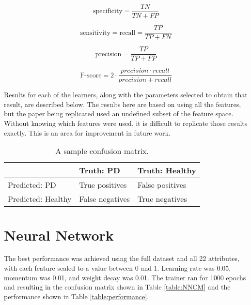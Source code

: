 \documentclass[draftcopy]{srpaper}
\begin{document}
\begin{equation}
\mbox{specificity} = \frac{TN}{TN + FP}
\label{eq:recall}
\end{equation}

\begin{equation}
\mbox{sensitivity} = \mbox{recall} = \frac{TP}{TP + FN}
\label{eq:recall}
\end{equation}

\begin{equation}
\mbox{precision} = \frac{TP}{TP + FP}
\label{eq:precision}
\end{equation}

\begin{equation}
\mbox{F-score} = 2 \cdot \frac{precision \cdot recall}{precision + recall}
\label{eq:fscore}
\end{equation}

Results for each of the learners, along with the parameters selected
to obtain that result, are described below. The results here are based on using all the features, but the paper
being replicated used an undefined subset of the feature
space. Without knowing which features were used, it is difficult to
replicate those results exactly. This is an area for
improvement in future work.

\begin{table}
\begin{center}
\begin{tabular}{|l|l|l|} 
\hline
& Truth: PD & Truth: Healthy \\ \hline
Predicted: PD & True positives & False positives \\ \hline
Predicted: Healthy & False negatives & True negatives \\ \hline

\end{tabular}
\end{center}
\caption[Confusion Matrix sample]{A sample confusion matrix.}
\label{table:sampleCM}
\end{table}

\section{Neural Network}
The best performance was achieved using the full dataset and all 22 attributes, with each
feature scaled to a value between 0 and 1. Learning rate was 0.05,
momentum was 0.01, and weight decay was 0.01. The trainer ran for 1000
epochs and resulting in the confusion matrix shown in Table
\ref{table:NNCM} and the performance shown in Table
\ref{table:performance}.
\end{document}
